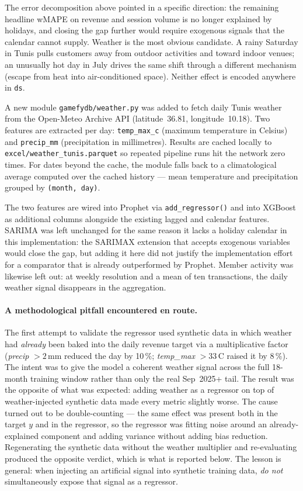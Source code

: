 The error decomposition above pointed in a specific direction: the remaining
headline wMAPE on revenue and session volume is no longer explained by
holidays, and closing the gap further would require exogenous signals
that the calendar cannot supply. Weather is the most obvious candidate.
A rainy Saturday in Tunis pulls customers away from outdoor activities and
toward indoor venues; an unusually hot day in July drives the same shift
through a different mechanism (escape from heat into air-conditioned space).
Neither effect is encoded anywhere in \texttt{ds}.

A new module \texttt{gamefydb/weather.py} was added to fetch daily Tunis
weather from the Open-Meteo Archive API (latitude~36.81, longitude~10.18).
Two features are extracted per day: \texttt{temp\_max\_c} (maximum
temperature in Celsius) and \texttt{precip\_mm} (precipitation in
millimetres). Results are cached locally to
\texttt{excel/weather\_tunis.parquet} so repeated pipeline runs hit the
network zero times. For dates beyond the cache, the module falls back to a
climatological average computed over the cached history --- mean
temperature and precipitation grouped by \texttt{(month, day)}.

The two features are wired into Prophet via \texttt{add\_regressor()} and
into XGBoost as additional columns alongside the existing lagged and
calendar features. SARIMA was left unchanged for the same reason it lacks
a holiday calendar in this implementation: the SARIMAX extension that
accepts exogenous variables would close the gap, but adding it here did
not justify the implementation effort for a comparator that is already
outperformed by Prophet. Member activity was likewise left out: at weekly
resolution and a mean of ten transactions, the daily weather signal
disappears in the aggregation.

\paragraph{A methodological pitfall encountered en route.}
The first attempt to validate the regressor used synthetic data in which
weather had \emph{already} been baked into the daily revenue target via a
multiplicative factor (\textit{precip} $> 2$\,mm reduced the day by
10\,\%; \textit{temp\_max} $> 33$\,\degree C raised it by 8\,\%). The
intent was to give the model a coherent weather signal across the full
18-month training window rather than only the real Sep~2025+ tail.
The result was the opposite of what was expected: adding weather as a
regressor on top of weather-injected synthetic data made every metric
slightly worse. The cause turned out to be double-counting --- the same
effect was present both in the target $y$ and in the regressor, so the
regressor was fitting noise around an already-explained component and
adding variance without adding bias reduction. Regenerating the synthetic
data without the weather multiplier and re-evaluating produced the
opposite verdict, which is what is reported below. The lesson is general:
when injecting an artificial signal into synthetic training data,
\emph{do not} simultaneously expose that signal as a regressor.

